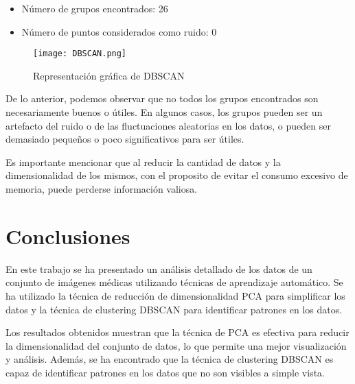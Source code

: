 \documentclass{article}
\begin{document}
\begin{itemize}
\item Número de grupos encontrados: 26
\item Número de puntos considerados como ruido: 0
\end{itemize}

\begin{figure}[h]
\centering
\texttt{[image: DBSCAN.png]}
\caption{Representación gráfica de DBSCAN}
\label{fig:reachability_plot}
\end{figure}

De lo anterior, podemos observar que no todos los grupos encontrados son necesariamente buenos o útiles. En algunos casos, los grupos pueden ser un artefacto del ruido o de las fluctuaciones aleatorias en los datos, o pueden ser demasiado pequeños o poco significativos para ser útiles. 

Es importante mencionar que al reducir la cantidad de datos y la dimensionalidad de los mismos, con el proposito de evitar el consumo excesivo de memoria, puede perderse información valiosa.

\section{Conclusiones}

En este trabajo se ha presentado un análisis detallado de los datos de un conjunto de imágenes médicas utilizando técnicas de aprendizaje automático. Se ha utilizado la técnica de reducción de dimensionalidad PCA para simplificar los datos y la técnica de clustering DBSCAN para identificar patrones en los datos.

Los resultados obtenidos muestran que la técnica de PCA es efectiva para reducir la dimensionalidad del conjunto de datos, lo que permite una mejor visualización y análisis. Además, se ha encontrado que la técnica de clustering DBSCAN es capaz de identificar patrones en los datos que no son visibles a simple vista.
\end{document}
